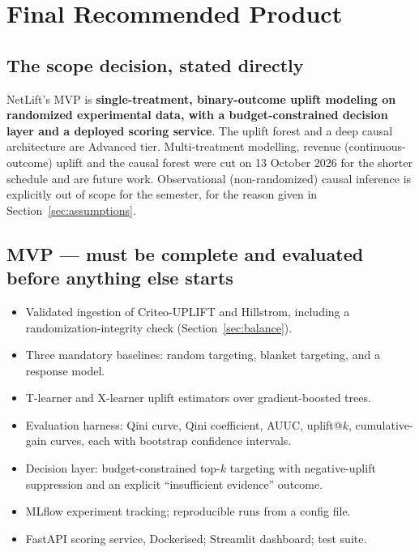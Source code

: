 \documentclass[11pt,a4paper]{article}
\begin{document}
\section{Final Recommended Product}

\subsection{The scope decision, stated directly}

\begin{keybox}
NetLift's MVP is \textbf{single-treatment, binary-outcome uplift modeling on randomized
experimental data, with a budget-constrained decision layer and a deployed scoring service}.
The uplift forest and a deep causal architecture are Advanced tier. Multi-treatment modelling,
revenue (continuous-outcome) uplift and the causal forest were cut on 13 October 2026 for the
shorter schedule and are future work. Observational (non-randomized) causal inference is
explicitly out of scope for the semester, for the reason given in Section~\ref{sec:assumptions}.
\end{keybox}

\subsection{MVP --- must be complete and evaluated before anything else starts}

\begin{itemize}
\item Validated ingestion of Criteo-UPLIFT and Hillstrom, including a randomization-integrity
check (Section~\ref{sec:balance}).
\item Three mandatory baselines: random targeting, blanket targeting, and a response model.
\item T-learner and X-learner uplift estimators over gradient-boosted trees.
\item Evaluation harness: Qini curve, Qini coefficient, AUUC, uplift@$k$, cumulative-gain curves,
each with bootstrap confidence intervals.
\item Decision layer: budget-constrained top-$k$ targeting with negative-uplift suppression and an
explicit ``insufficient evidence'' outcome.
\item MLflow experiment tracking; reproducible runs from a config file.
\item FastAPI scoring service, Dockerised; Streamlit dashboard; test suite.
\end{itemize}
\end{document}
